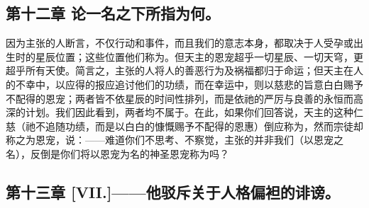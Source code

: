 
\subsection{第十二章 论一名之下所指为何。}

因为主张的人断言，不仅行动和事件，而且我们的意志本身，都取决于人受孕或出生时的星辰位置；这些位置他们称为。但天主的恩宠超乎一切星辰、一切天穹，更超乎所有天使。简言之，主张的人将人的善恶行为及祸福都归于命运；但天主在人的不幸中，以应得的报应追讨他们的功绩，而在幸运中，则以慈悲的旨意白白赐予不配得的恩宠；两者皆不依星辰的时间性排列，而是依祂的严厉与良善的永恒而高深的计划。我们因此看到，两者均不属于。在此，如果你们回答说，天主的这种仁慈（祂不追随功绩，而是以白白的慷慨赐予不配得的恩惠）倒应称为，然而宗徒却称之为恩宠，说：——难道你们不思考、不察觉，主张的并非我们（以恩宠之名），反倒是你们将以恩宠为名的神圣恩宠称为吗？\par


\subsection{第十三章 [VII.]——他驳斥关于人格偏袒的诽谤。}

